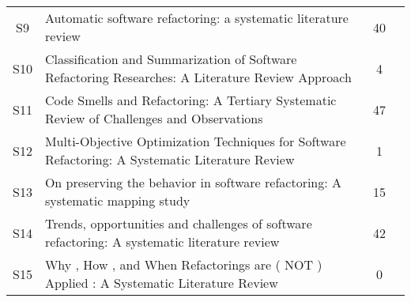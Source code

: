\begin{longtable}{cp{9cm}cp{3cm}}
S9  & Automatic software refactoring: a systematic literature review                                     & 40          & \citeauthor*{Baqais2020}                             \\
S10 & Classification and Summarization of Software Refactoring Researches: A Literature Review Approach  & 4           & \citeauthor*{Abebe2014b}                              \\
S11 & Code Smells and Refactoring: A Tertiary Systematic Review of Challenges and Observations           & 47          & \citeauthor*{Lacerda2020}                            \\
S12 & Multi-Objective Optimization Techniques for Software Refactoring: A Systematic Literature Review   & 1           & \citeauthor*{Rafique2019}                            \\
S13 & On preserving the behavior in software refactoring: A systematic mapping study                     & 15          & \citeauthor*{AlOmar2021}                             \\
S14 & Trends, opportunities and challenges of software refactoring: A systematic literature review       & 42          & \citeauthor*{Abebe2014a}                              \\
S15 & Why , How , and When Refactorings are ( NOT ) Applied : A Systematic Literature Review             & 0           & \citeauthor*{Buriakovskyi2018}                                
\end{longtable}